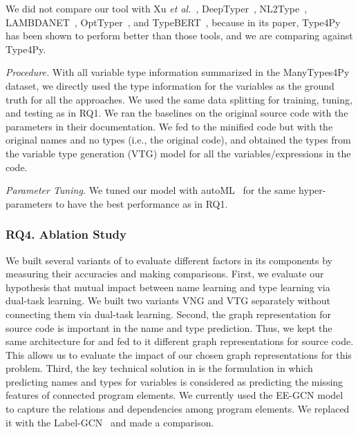 We did not compare our tool with Xu {\em et al.}~\cite{xu-fse16},
DeepTyper~\cite{DeepTyper-fse18}, NL2Type~\cite{nl2type-icse19},
LAMBDANET~\cite{LambdaNet-iclr20}, OptTyper~\cite{optyper20}, and
TypeBERT~\cite{typeBERT-fse21}, because in its paper, Type4Py has been
shown to perform better than those tools, and we are comparing against
Type4Py.


\textit{Procedure.}  With all variable type information summarized in
the ManyTypes4Py dataset, we directly used the type information for
the variables as the ground truth for all the approaches. We used the
same data splitting for training, tuning, and testing as in RQ1. We
ran the baselines on the original source code with the parameters in
their documentation. We fed to {\tool} the minified code but with the
original names and no types (i.e., the original code), and obtained
the types from the variable type generation (VTG) model for all the
variables/expressions in the code.


{\em Parameter Tuning.} We tuned our model with
autoML~\cite{NNI} for the same hyper-parameters to have the best
performance as in RQ1. 


\subsubsection{RQ4. Ablation Study}

We built several variants of {\tool} to evaluate different factors in
its components by measuring their accuracies and making comparisons.
First, we evaluate our hypothesis that mutual impact between name
learning and type learning via dual-task learning. We built two
variants VNG and VTG separately without connecting them via dual-task
learning. Second, the graph representation for source code is
important in the name and type prediction. Thus, we kept the same
architecture for {\tool} and fed to it different graph representations
for source code. This allows us to evaluate the impact of our chosen
graph representations for this problem. Third, the key technical
solution in {\tool} is the formulation in which predicting names and
types for variables is considered as predicting the missing features
of connected program elements. We currently used the EE-GCN model to
capture the relations and dependencies among program elements. We
replaced it with the Label-GCN~\cite{label-gcn} and made a comparison.

